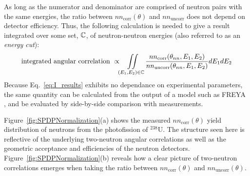 As long as the numerator and denominator are comprised of neutron pairs with the same energies, the ratio between $nn_{\text{corr}}(\theta)$ and $nn_{\text{uncorr}}$ does not depend on detector efficiency.
Thus, the following calculation is needed to give a result integrated over some set, $\mathbb{C}$, of neutron-neutron energies (also referred to as an \emph{energy cut}):
\begin{equation}
\label{eq:I_results}
\text{integrated angular correlation }\propto  \iint \limits_{(E_1,E_2 ) \in \mathbb{C}}  \frac{nn_{\text{corr}}(\theta_{nn}, E_1, E_2)}{nn_{\text{uncorr}}(\theta_{nn},E_1, E_2)} dE_1 dE_2
\end{equation}
Because Eq.~\ref{eq:I_results} exhibits no dependance on experimental parameters, the same quantity can be calculated from the output of a model such as FREYA , and be evaluated by side-by-side comparison with measurements.

Figure~\ref{fig:SPDPNormalization}(a) shows the measured $nn_{\text{corr}}(\theta)$ yield distribution of neutrons from the photofission of $^{238}$U.
The structure seen here is reflective of the underlying two-neutron angular correlations as well as the geometric acceptance and efficiencies of the neutron detectors.
Figure~\ref{fig:SPDPNormalization}(b) reveals how a clear picture of two-neutron correlations emerges when taking the ratio between $nn_{\text{corr}}(\theta)$ and $nn_{\text{uncorr}}(\theta)$.

